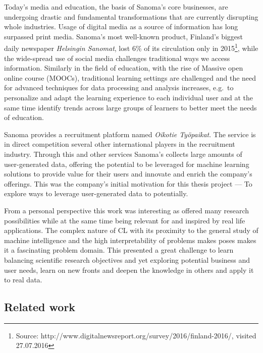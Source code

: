 
Today's media and education, the basis of Sanoma's core businesses, are undergoing drastic and fundamental transformations that are currently disrupting whole industries. Usage of digital media as a source of information has long surpassed print media. Sanoma's most well-known product, Finland's biggest daily newspaper \emph{Helsingin Sanomat}, lost 6\% of its circulation only in 2015\footnote{Source: http://www.digitalnewsreport.org/survey/2016/finland-2016/, visited 27.07.2016}, while the wide-spread use of social media challenges traditional ways we access information. Similarly in the field of education, with the rise of Massive open online course (MOOCs), traditional learning settings are challenged and the need for advanced techniques for data processing and analysis increases, e.g.\ to personalize and adapt the learning experience to each individual user and at the same time identify trends across large groups of learners to better meet the needs of education.

Sanoma provides a recruitment platform named \emph{Oikotie Työpaikat}. The service is in direct competition several other international players in the recruitment industry. Through this and other services Sanoma's collects large amounts of user-generated data, offering the potential to be leveraged for machine learning solutions to provide value for their users and innovate and enrich the company's offerings.
This was the company's initial motivation for this thesis project --- To explore ways to leverage user-generated data to potentially.



From a personal perspective this work was interesting as offered many research possibilities while at the same time being relevant for and inspired by real life applications. The complex nature of \acrlong{CL} with its proximity to the general study of machine intelligence and the high interpretability of problems makes poses makes it a fascinating problem domain. This presented a great challenge to learn balancing scientific research objectives and yet exploring potential business and user needs, learn on new fronts and deepen the knowledge in others and apply it to real data.

\subsection{Related work}
\label{sub:Related work}

